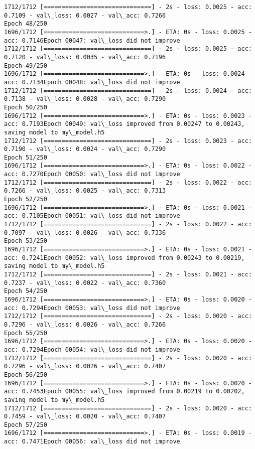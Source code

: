\documentclass[11pt]{article}
\begin{document}
\begin{Verbatim}[commandchars=\\\{\}]
1712/1712 [==============================] - 2s - loss: 0.0025 - acc: 0.7109 - val\_loss: 0.0027 - val\_acc: 0.7266
Epoch 48/250
1696/1712 [============================>.] - ETA: 0s - loss: 0.0025 - acc: 0.7146Epoch 00047: val\_loss did not improve
1712/1712 [==============================] - 2s - loss: 0.0025 - acc: 0.7120 - val\_loss: 0.0035 - val\_acc: 0.7196
Epoch 49/250
1696/1712 [============================>.] - ETA: 0s - loss: 0.0024 - acc: 0.7134Epoch 00048: val\_loss did not improve
1712/1712 [==============================] - 2s - loss: 0.0024 - acc: 0.7138 - val\_loss: 0.0028 - val\_acc: 0.7290
Epoch 50/250
1696/1712 [============================>.] - ETA: 0s - loss: 0.0023 - acc: 0.7193Epoch 00049: val\_loss improved from 0.00247 to 0.00243, saving model to my\_model.h5
1712/1712 [==============================] - 2s - loss: 0.0023 - acc: 0.7190 - val\_loss: 0.0024 - val\_acc: 0.7290
Epoch 51/250
1696/1712 [============================>.] - ETA: 0s - loss: 0.0022 - acc: 0.7270Epoch 00050: val\_loss did not improve
1712/1712 [==============================] - 2s - loss: 0.0022 - acc: 0.7266 - val\_loss: 0.0025 - val\_acc: 0.7313
Epoch 52/250
1696/1712 [============================>.] - ETA: 0s - loss: 0.0021 - acc: 0.7105Epoch 00051: val\_loss did not improve
1712/1712 [==============================] - 2s - loss: 0.0022 - acc: 0.7097 - val\_loss: 0.0026 - val\_acc: 0.7336
Epoch 53/250
1696/1712 [============================>.] - ETA: 0s - loss: 0.0021 - acc: 0.7241Epoch 00052: val\_loss improved from 0.00243 to 0.00219, saving model to my\_model.h5
1712/1712 [==============================] - 2s - loss: 0.0021 - acc: 0.7237 - val\_loss: 0.0022 - val\_acc: 0.7360
Epoch 54/250
1696/1712 [============================>.] - ETA: 0s - loss: 0.0020 - acc: 0.7294Epoch 00053: val\_loss did not improve
1712/1712 [==============================] - 2s - loss: 0.0020 - acc: 0.7296 - val\_loss: 0.0026 - val\_acc: 0.7266
Epoch 55/250
1696/1712 [============================>.] - ETA: 0s - loss: 0.0020 - acc: 0.7294Epoch 00054: val\_loss did not improve
1712/1712 [==============================] - 2s - loss: 0.0020 - acc: 0.7296 - val\_loss: 0.0026 - val\_acc: 0.7407
Epoch 56/250
1696/1712 [============================>.] - ETA: 0s - loss: 0.0020 - acc: 0.7453Epoch 00055: val\_loss improved from 0.00219 to 0.00202, saving model to my\_model.h5
1712/1712 [==============================] - 2s - loss: 0.0020 - acc: 0.7459 - val\_loss: 0.0020 - val\_acc: 0.7407
Epoch 57/250
1696/1712 [============================>.] - ETA: 0s - loss: 0.0019 - acc: 0.7471Epoch 00056: val\_loss did not improve

\end{Verbatim}
\end{document}
